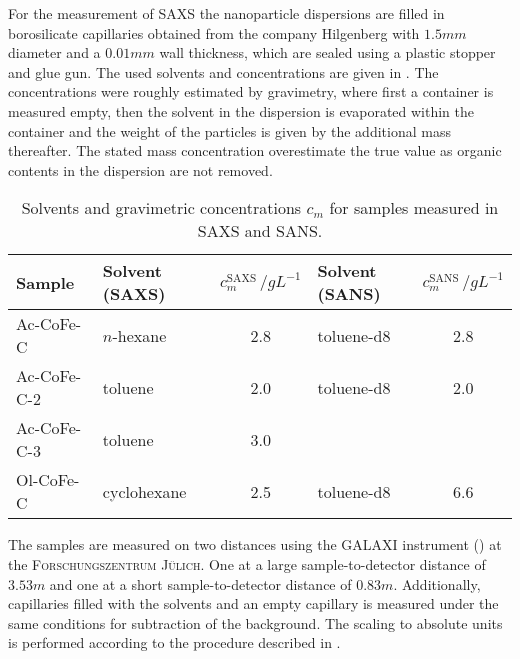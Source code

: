 \documentclass[\main/dresen_thesis.tex]{subfiles}
\begin{document}
    For the measurement of SAXS the nanoparticle dispersions are filled in borosilicate capillaries obtained from the company Hilgenberg with $1.5 \unit{mm}$ diameter and a $0.01 \unit{mm}$ wall thickness, which are sealed using a plastic stopper and glue gun.
    The used solvents and concentrations are given in .
    The concentrations were roughly estimated by gravimetry, where first a container is measured empty, then the solvent in the dispersion is evaporated within the container and the weight of the particles is given by the additional mass thereafter.
    The stated mass concentration overestimate the true value as organic contents in the dispersion are not removed.
    \begin{table}[!htbp]
      \centering
      \caption{\label{tab:monolayers:charMethod:sampleConcentrations}Solvents and gravimetric concentrations $c_m$ for samples measured in SAXS and SANS.}
      \begin{tabular}{ l | l | c | l | c }
        \textbf{Sample}  & Solvent (SAXS) & $c_m^\mathrm{SAXS} \,/ \unit{gL^{-1}}$ & Solvent (SANS) & $c_m^\mathrm{SANS}\,/ \unit{gL^{-1}}$\\
        \hline
        Ac-CoFe-C   & $\mathit{n}$-hexane & 2.8                 & toluene-d8       & 2.8\\
        Ac-CoFe-C-2 & toluene             & 2.0                 & toluene-d8       & 2.0\\
        Ac-CoFe-C-3 & toluene             & 3.0                 &                  & \\
        Ol-CoFe-C   & cyclohexane         & 2.5                 & toluene-d8       & 6.6\\
        \hline
      \end{tabular}
    \end{table}

    The samples are measured on two distances using the GALAXI instrument () at the \textsc{Forschungszentrum J\"ulich}.
    One at a large sample-to-detector distance of $3.53 \unit{m}$ and one at a short sample-to-detector distance of $0.83 \unit{m}$.
    Additionally, capillaries filled with the solvents and an empty capillary is measured under the same conditions for subtraction of the background.
    The scaling to absolute units is performed according to the procedure described in .
\end{document}
